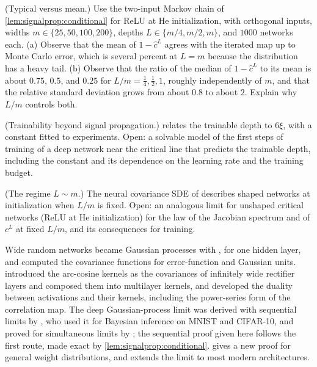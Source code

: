 \begin{refsection}
\begin{exercises}
\item \simulation (Typical versus mean.) Use the two-input Markov chain of \cref{lem:signalprop:conditional} for ReLU at He initialization, with orthogonal inputs, widths $m\in\{25,50,100,200\}$, depths $L\in\{m/4,m/2,m\}$, and $1000$ networks each. (a) Observe that the mean of $1-\hat c^L$ agrees with the iterated map up to Monte Carlo error, which is several percent at $L=m$ because the distribution has a heavy tail. (b) Observe that the ratio of the median of $1-\hat c^L$ to its mean is about $0.75$, $0.5$, and $0.25$ for $L/m=\frac14,\frac12,1$, roughly independently of $m$, and that the relative standard deviation grows from about $0.8$ to about $2$. Explain why $L/m$ controls both.\label{ex:signalprop:fluct}

\item \research (Trainability beyond signal propagation.)  relates the trainable depth to $6\xi$, with a constant fitted to experiments. Open: a solvable model of the first steps of training of a deep network near the critical line that predicts the trainable depth, including the constant and its dependence on the learning rate and the training budget.\label{ex:signalprop:researchtrain}

\item \research (The regime $L\sim m$.) The neural covariance SDE of \textcite{LiEtAl2022} describes shaped networks at initialization when $L/m$ is fixed. Open: an analogous limit for unshaped critical networks (ReLU at He initialization) for the law of the Jacobian spectrum and of $c^L$ at fixed $L/m$, and its consequences for training.\label{ex:signalprop:researchLm}
\end{exercises}

\notesandrefs
Wide random networks became Gaussian processes with \textcite{Neal1996}, for one hidden layer, and \textcite{Williams1997} computed the covariance functions for error-function and Gaussian units. \Textcite{ChoSaul2009} introduced the arc-cosine kernels as the covariances of infinitely wide rectifier layers and composed them into multilayer kernels, and \textcite{DanielyEtAl2016} developed the duality between activations and their kernels, including the power-series form of the correlation map. The deep Gaussian-process limit was derived with sequential limits by \textcite{LeeEtAl2018}, who used it for Bayesian inference on MNIST and CIFAR-10, and proved for simultaneous limits by \textcite{MatthewsEtAl2018}; the sequential proof given here follows the first route, made exact by \cref{lem:signalprop:conditional}. \Textcite{Hanin2023} gives a new proof for general weight distributions, and \textcite{Yang2019} extends the limit to most modern architectures.


\end{refsection}
